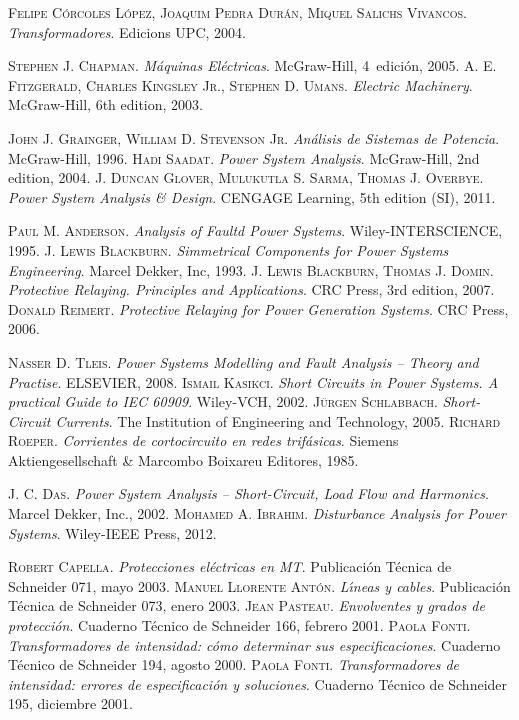 \begin{thebibliography}{99}
     \textsc{Felipe C\'{o}rcoles L\'{o}pez, Joaquim Pedra Dur\'{a}n, Miquel Salichs Vivancos}. \textsl{Transformadores}.  Edicions UPC, 2004.


     \textsc{Stephen J. Chapman}. \textsl{M\'{a}quinas El\'{e}ctricas}.  McGraw-Hill, 4\textordfeminine\ edici\'{o}n, 2005.
     \textsc{A. E. Fitzgerald, Charles Kingsley Jr., Stephen D. Umans}. \textsl{Electric Machinery}.  McGraw-Hill, 6th edition, 2003.


     \textsc{John J. Grainger, William D. Stevenson Jr}. \textsl{An\'{a}lisis de Sistemas de Potencia}.  McGraw-Hill, 1996.
     \textsc{Hadi Saadat}. \textsl{Power System Analysis}.  McGraw-Hill, 2nd edition, 2004.
     \textsc{J. Duncan Glover, Mulukutla S. Sarma, Thomas J. Overbye}. \textsl{Power System Analysis \& Design}.  CENGAGE Learning, 5th edition (SI), 2011.

     \textsc{Paul M. Anderson}. \textsl{Analysis of Faultd Power Systems}.  Wiley-INTERSCIENCE, 1995.
     \textsc{J. Lewis Blackburn}. \textsl{Simmetrical Components for Power Systems Engineering}.  Marcel Dekker, Inc, 1993.
     \textsc{J. Lewis Blackburn, Thomas J. Domin}. \textsl{Protective Relaying. Principles and Applications}.  CRC Press, 3rd edition, 2007.
     \textsc{Donald Reimert}. \textsl{Protective Relaying for Power Generation Systems}.  CRC Press, 2006.


     \textsc{Nasser D. Tleis}. \textsl{Power Systems Modelling and Fault Analysis -- Theory and Practise}.  ELSEVIER, 2008.
     \textsc{Ismail Kasikci}. \textsl{Short Circuits in Power Systems. A practical Guide to IEC 60909}.  Wiley-VCH, 2002.
     \textsc{J\"{u}rgen Schlabbach}. \textsl{Short-Circuit Currents}.  The Institution of Engineering and Technology, 2005.
     \textsc{Richard Roeper}. \textsl{Corrientes de cortocircuito en redes trif\'{a}sicas}.  Siemens Aktiengesellschaft \& Marcombo Boixareu Editores, 1985.
        
     \textsc{J. C. Das}. \textsl{Power System Analysis -- Short-Circuit, Load Flow and Harmonics}. Marcel Dekker, Inc., 2002.
     \textsc{Mohamed A. Ibrahim}. \textsl{Disturbance Analysis for Power Systems}. Wiley-IEEE Press, 2012.

     \textsc{Robert Capella}. \textsl{Protecciones el\'{e}ctricas en MT}.  Publicaci\'{o}n T\'{e}cnica de Schneider 071, mayo 2003.
     \textsc{Manuel Llorente Ant\'{o}n}. \textsl{L\'{\i}neas y cables}.  Publicaci\'{o}n T\'{e}cnica de Schneider 073, enero 2003.
     \textsc{Jean Pasteau}. \textsl{Envolventes y grados de protecci\'{o}n}.  Cuaderno T\'{e}cnico de Schneider 166, febrero 2001.
     \textsc{Paola Fonti}. \textsl{Transformadores de intensidad: c\'{o}mo determinar sus especificaciones}.  Cuaderno T\'{e}cnico de Schneider 194, agosto 2000.
     \textsc{Paola Fonti}. \textsl{Transformadores de intensidad: errores de especificaci\'{o}n y soluciones}.  Cuaderno T\'{e}cnico de Schneider 195, diciembre 2001.


\end{thebibliography}
